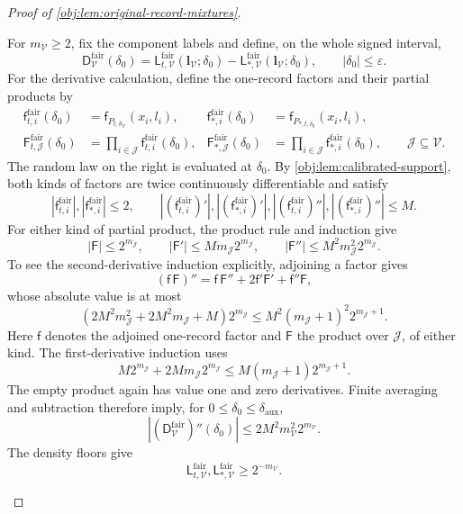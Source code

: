 \documentclass[11pt]{article}
\begin{document}
\begin{proof}[Proof of \cref{obj:lem:original-record-mixtures}]
\begin{enumerate}
For \(m_{\mathcal V}\ge2\), fix the component labels and define, on the
whole signed interval,
\[
\mathsf D_{\mathcal V}^{\mathrm{fair}}(\delta_0)
=
\mathsf L_{t,\mathcal V}^{\mathrm{fair}}
(\boldsymbol l_{\mathcal V};\delta_0)
-
\mathsf L_{*,\mathcal V}^{\mathrm{fair}}
(\boldsymbol l_{\mathcal V};\delta_0),
\qquad |\delta_0|\le\varepsilon.
\]
For the derivative calculation, define the one-record factors and
their partial products by
\[
\begin{aligned}
\mathsf f_{t,i}^{\mathrm{fair}}(\delta_0)
&=\mathsf f_{P_{t,\widehat\sigma_{\mathcal V}}}(x_i,l_i),&
\mathsf f_{*,i}^{\mathrm{fair}}(\delta_0)
&=\mathsf f_{P_{*,t,\delta_0}}(x_i,l_i),\\
\mathsf F_{t,\mathcal J}^{\mathrm{fair}}(\delta_0)
&=\prod_{i\in\mathcal J}\mathsf f_{t,i}^{\mathrm{fair}}(\delta_0),&
\mathsf F_{*,\mathcal J}^{\mathrm{fair}}(\delta_0)
&=\prod_{i\in\mathcal J}\mathsf f_{*,i}^{\mathrm{fair}}(\delta_0),
\qquad \mathcal J\subseteq\mathcal V.
\end{aligned}
\]
The random law on the right is evaluated at \(\delta_0\). By
\cref{obj:lem:calibrated-support}, both kinds of factors are twice
continuously differentiable and satisfy
\[
|\mathsf f_{t,i}^{\mathrm{fair}}|,
|\mathsf f_{*,i}^{\mathrm{fair}}|\le2,\qquad
|(\mathsf f_{t,i}^{\mathrm{fair}})'|,
|(\mathsf f_{*,i}^{\mathrm{fair}})'|,
|(\mathsf f_{t,i}^{\mathrm{fair}})''|,
|(\mathsf f_{*,i}^{\mathrm{fair}})''|\le M.
\]
For either kind of partial product, the product rule and induction
give
\[
|\mathsf F|\le2^{m_{\mathcal J}},\qquad
|\mathsf F'|\le M m_{\mathcal J}2^{m_{\mathcal J}},\qquad
|\mathsf F''|\le M^2m_{\mathcal J}^2 2^{m_{\mathcal J}}.
\]
To see the second-derivative induction explicitly, adjoining a
factor gives
\[
(\mathsf f\,\mathsf F)''
=\mathsf f\,\mathsf F''+2\mathsf f'\mathsf F'
+\mathsf f''\mathsf F,
\]
whose absolute value is at most
\[
\left(2M^2m_{\mathcal J}^2+2M^2m_{\mathcal J}+M\right)
2^{m_{\mathcal J}}
\le
M^2(m_{\mathcal J}+1)^2 2^{m_{\mathcal J}+1}.
\]
Here \(\mathsf f\) denotes the adjoined one-record factor and
\(\mathsf F\) the product over \(\mathcal J\), of either kind. The
first-derivative induction uses
\[
M2^{m_{\mathcal J}}+
2M m_{\mathcal J}2^{m_{\mathcal J}}
\le M(m_{\mathcal J}+1)2^{m_{\mathcal J}+1}.
\]
The empty product again has value one and zero derivatives.
Finite averaging and subtraction therefore imply, for
\(0\le\delta_0\le\delta_{\mathrm{aux}}\),
\[
|(\mathsf D_{\mathcal V}^{\mathrm{fair}})''(\delta_0)|
\le2M^2m_{\mathcal V}^2 2^{m_{\mathcal V}}.
\]
The density floors give
\[
\mathsf L_{t,\mathcal V}^{\mathrm{fair}},
\mathsf L_{*,\mathcal V}^{\mathrm{fair}}
\ge2^{-m_{\mathcal V}}.
\]


\end{enumerate}
\end{proof}
\end{document}
